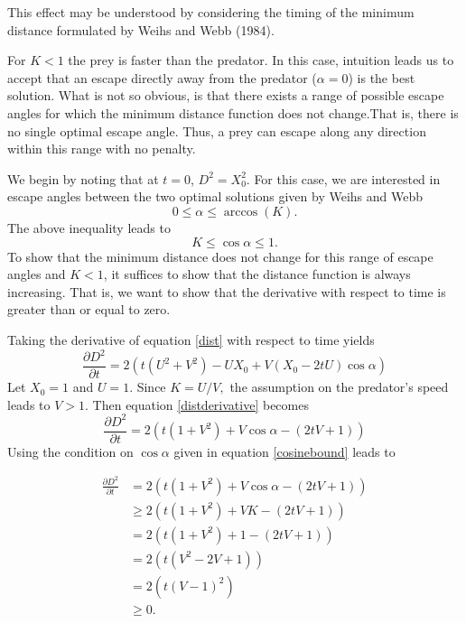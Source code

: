 \documentclass[12pt]{article}
\def\d{\partial}
\begin{document}
This effect may be understood by considering the timing of the minimum distance formulated by Weihs and Webb (1984). 

For $K<1$ the prey is faster than the predator. In this case, intuition leads us to accept that an escape directly away from the predator ($\alpha =0$) is the best solution. What is not so obvious, is that there exists a range of possible escape angles for which the minimum distance function does not change.That is, there is no single optimal escape angle. Thus, a prey can escape along any direction within this range with no penalty.

We begin by noting that at $t=0$, $D^2 = X_0^2.$ For this case, we are interested in escape angles between the two optimal solutions given by Weihs and Webb
%
\begin{equation}
0 \leq \alpha \leq \arccos(K).
\label{anglerange}
\end{equation}
The above inequality leads to 
\begin{equation}
K \leq \cos\alpha \leq 1.
\label{cosinebound}
\end{equation}      
%
To show that the minimum distance does not change for this range of escape angles and $K<1$, it suffices to show that the distance function is always increasing. That is, we want to show that the derivative with respect to time is greater than or equal to zero. 

Taking the derivative of equation \eqref{dist} with respect to time yields
%
\begin{equation}
\frac{\d D^2}{\d t}  = 2(t(U^2+V^2) - UX_0 + V(X_0-2tU)\cos\alpha)
\label{distderivative}
\end{equation}  
%
Let $X_0=1$ and $U=1$. Since $K = U/V,$ the assumption on the predator's speed leads to $V > 1.$ 
Then equation \eqref{distderivative} becomes
%
\begin{equation}
\frac{\d D^2}{\d t}  = 2(t(1+V^2) +V\cos\alpha - (2tV + 1))
\label{distderivative2}
\end{equation}
%
Using the condition on $\cos\alpha$ given in equation \eqref{cosinebound} leads to

\begin{align*}
\frac{\d D^2}{\d t}  & = 2(t(1+V^2) +V\cos\alpha - (2tV + 1)) \\
& \geq 2(t(1+V^2) +VK - (2tV + 1)) \\
& = 2(t(1+V^2) +1 - (2tV + 1)) \\
& = 2(t(V^2- 2V + 1)) \\
& =2(t(V-1)^2)\\
& \geq 0.
\end{align*}
\end{document}
